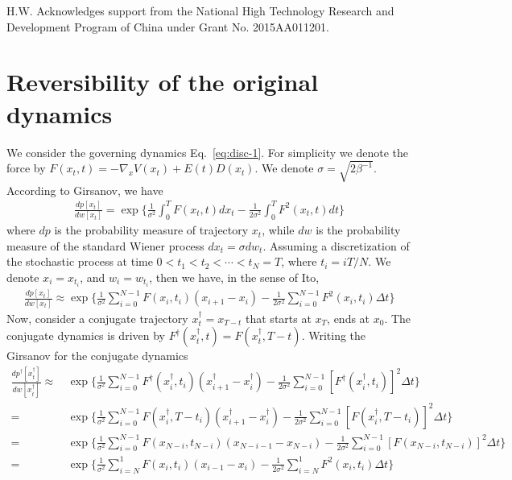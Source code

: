\documentclass[journal=jctcce,manuscript=article]{achemso}
\newcommand{\dt}[0]{\Delta t}
\begin{document}
H.W. Acknowledges support from the National High Technology Research and Development
Program of China under Grant No. 2015AA011201.

\appendix

\section{Reversibility of the original dynamics}
\label{sec:app-revs}

We consider the governing dynamics Eq.~\eqref{eq:disc-1}.
For simplicity we denote the force by $F(x_t,t) = -\nabla_x V(x_t)+ E(t)D(x_t) $.  We denote $\sigma =  \sqrt{2\beta^{-1}} $.
According to Girsanov, we have
\begin{align}
  \label{eq:tmp8}
  \frac{dp[x_t]}{dw[x_t]}  =
  \exp \bigg\{
  \frac 1{\sigma^2}\int_0^T F(x_t,t) dx_t -
  \frac1{2\sigma^2}\int_0^T F^2(x_t,t) dt
  \bigg\}
\end{align}
where $dp$ is the probability measure of trajectory $x_t$, while $dw$ is the
probability measure of the standard Wiener process $dx_t = \sigma dw_t$.
Assuming a discretization of the
stochastic process at time $0 < t_1 < t_2 < \cdots < t_N = T$, where
$t_i = iT / N$. We denote $x_i = x_{t_i}$, and $w_i = w_{t_i}$, then we have,
in the sense of Ito,
\begin{align}\label{eq:tmp9}
  \frac{dp[x_t]}{dw[x_t]}  \approx
  \exp\bigg\{\frac1{\sigma^2}\sum_{i=0}^{N-1} F(x_{i},t_{i})(x_{i+1} - x_i) -\frac1{2\sigma^2}\sum_{i=0}^{N-1}F^2(x_i,t_i)\dt\bigg\} 
\end{align}
Now, consider a conjugate trajectory $x^\dagger_t = x_{T-t}$ that starts at $x_T$, ends at $x_0$. The conjugate dynamics is driven by  $F^\dagger(x^\dagger_t,t) = F(x^\dagger_t, T-t)$.
Writing the Girsanov for the conjugate dynamics
\begin{align}\label{eq:dagger-0}
  \frac{dp^\dagger[x^\dagger_t]}{dw[x^\dagger_t]}  
  \approx\,&
  \exp\bigg\{
  \frac1{\sigma^2}\sum_{i=0}^{N-1} F^\dagger(x^\dagger_{i},t_{i})(x^\dagger_{i+1} - x^\dagger_i) -
  \frac1{2\sigma^2}\sum_{i=0}^{N-1}[F^\dagger(x^\dagger_i,t_i)]^2\dt\bigg\} \\ \nonumber
  =\,&
  \exp\bigg\{
  \frac1{\sigma^2}\sum_{i=0}^{N-1} F(x^\dagger_{i},T - t_{i})(x^\dagger_{i+1} - x^\dagger_i) -
  \frac1{2\sigma^2}\sum_{i=0}^{N-1}[F(x^\dagger_i, T-t_i)]^2\dt\bigg\} \\\nonumber
  =\,&
  \exp\bigg\{
  \frac1{\sigma^2}\sum_{i=0}^{N-1} F(x_{N-i},t_{N-i})(x_{N-i-1} - x_{N-i}) -
  \frac1{2\sigma^2}\sum_{i=0}^{N-1}[F(x_{N-i},t_{N-i})]^2\dt\bigg\} \\
  = \,&
  \exp\bigg\{
  \frac1{\sigma^2}\sum_{i=N}^{1} F(x_{i},t_{i})(x_{i-1} - x_i) -
  \frac1{2\sigma^2}\sum_{i=N}^{1}F^2(x_i,t_i)\dt\bigg\}
\end{align}
\end{document}
